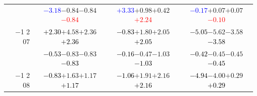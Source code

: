 \documentclass[compress]{beamer}
\begin{document}
\begin{frame}
\begin{tabular}{r | c | c | c}
          & \textcolor{blue}{$-3.18$}\hspace{0.1 cm}$-0.84$\hspace{0.1 cm}$-0.84$\hspace{0.1 cm}\textcolor{red}{$-0.84$} & \textcolor{blue}{$+3.33$}\hspace{0.1 cm}$+0.98$\hspace{0.1 cm}$+0.42$\hspace{0.1 cm}\textcolor{red}{$+2.24$} & \textcolor{blue}{$-0.17$}\hspace{0.1 cm}$+0.07$\hspace{0.1 cm}$+0.07$\hspace{0.1 cm}\textcolor{red}{$-0.10$} \\
$-$1 2 07 & \textcolor{black}{$+2.30$}\hspace{0.1 cm}$+4.58$\hspace{0.1 cm}$+2.36$\hspace{0.1 cm}\textcolor{black}{$+2.36$} & \textcolor{black}{$-0.83$}\hspace{0.1 cm}$+1.80$\hspace{0.1 cm}$+2.05$\hspace{0.1 cm}\textcolor{black}{$+2.05$} & \textcolor{black}{$-5.05$}\hspace{0.1 cm}$-5.62$\hspace{0.1 cm}$-3.58$\hspace{0.1 cm}\textcolor{black}{$-3.58$} \\
          & \textcolor{black}{$-0.53$}\hspace{0.1 cm}$-0.83$\hspace{0.1 cm}$-0.83$\hspace{0.1 cm}\textcolor{black}{$-0.83$} & \textcolor{black}{$-0.16$}\hspace{0.1 cm}$-0.47$\hspace{0.1 cm}$-1.03$\hspace{0.1 cm}\textcolor{black}{$-1.03$} & \textcolor{black}{$-0.42$}\hspace{0.1 cm}$-0.45$\hspace{0.1 cm}$-0.45$\hspace{0.1 cm}\textcolor{black}{$-0.45$} \\
$-$1 2 08 & \textcolor{black}{$-0.83$}\hspace{0.1 cm}$+1.63$\hspace{0.1 cm}$+1.17$\hspace{0.1 cm}\textcolor{black}{$+1.17$} & \textcolor{black}{$-1.06$}\hspace{0.1 cm}$+1.91$\hspace{0.1 cm}$+2.16$\hspace{0.1 cm}\textcolor{black}{$+2.16$} & \textcolor{black}{$-4.94$}\hspace{0.1 cm}$-4.00$\hspace{0.1 cm}$+0.29$\hspace{0.1 cm}\textcolor{black}{$+0.29$} \\

\end{tabular}
\end{frame}
\end{document}
